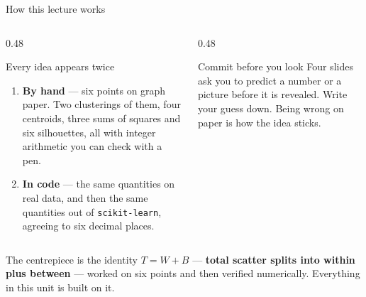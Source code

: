 \documentclass[aspectratio=169]{beamer}
\begin{document}
\begin{frame}[shrink=7]{How this lecture works}
  \begin{columns}[T]
    \begin{column}{0.48\textwidth}
      \begin{block}{Every idea appears twice}
        \begin{enumerate}
          \item \textbf{By hand} --- six points on graph paper. Two
            clusterings of them, four centroids, three sums of squares and
            six silhouettes, all with integer arithmetic you can check with
            a pen.
          \item \textbf{In code} --- the same quantities on real data, and
            then the same quantities out of \texttt{scikit-learn}, agreeing
            to six decimal places.
        \end{enumerate}
      \end{block}
    \end{column}
    \begin{column}{0.48\textwidth}
      \begin{alertblock}{Commit before you look}
        Four slides ask you to predict a number or a picture before it is
        revealed. Write your guess down. Being wrong on paper is how the
        idea sticks.
      \end{alertblock}
    \end{column}
  \end{columns}
  \vspace{0.4em}
  \begin{center}
    \small The centrepiece is the identity $T = W + B$ --- \textbf{total
    scatter splits into within plus between} --- worked on six points and
    then verified numerically. Everything in this unit is built on it.
  \end{center}
\end{frame}
\end{document}
